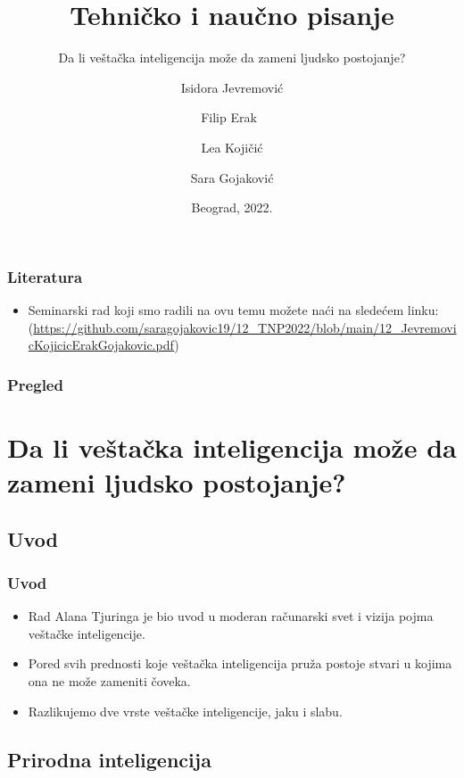 \documentclass{beamer}
\title{Tehničko i naučno pisanje}
\subtitle{Da li veštačka inteligencija može da zameni ljudsko postojanje?}
\author{Isidora Jevremović \and Filip Erak\ \and Lea Kojičić \and Sara Gojaković}
\institute{Matematički fakultet\\Univerzitet u Beogradu}
\date{
	\footnotesize{Beograd, 2022.}	
}
\begin{document}
\begin{frame}
	\thispagestyle{empty}
	\titlepage
\end{frame}

\addtocounter{framenumber}{-1}

\begin{frame}[fragile]\frametitle{Literatura}
	\begin{itemize}
		\item Seminarski rad koji smo radili na ovu temu možete naći na sledećem linku:
		(\url{https://github.com/saragojakovic19/12_TNP2022/blob/main/12_JevremovicKojicicErakGojakovic.pdf})
	\end{itemize}
\end{frame}

\begin{frame}
	\frametitle{Pregled} %
	\tableofcontents[] 
\end{frame}
\section{Da li veštačka inteligencija može da zameni ljudsko postojanje?}

\subsection{Uvod}

\begin{frame}[fragile]\frametitle{Uvod}
	\begin{itemize}	
		\item Rad Alana Tjuringa je bio uvod u moderan računarski svet i vizija pojma veštačke inteligencije.
		\item Pored svih prednosti koje veštačka inteligencija pruža postoje stvari u kojima ona ne može zameniti čoveka.
       \item Razlikujemo dve vrste veštačke inteligencije, jaku i slabu.
	\end{itemize}
 

 
\end{frame}

\subsection{Prirodna inteligencija}
\end{document}
